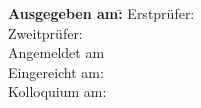 \vspace*{19cm}
\begin{tabbing}
    \textbf{Ausgegeben am:}\qquad \= \kill
    \textsf{Erstprüfer:} \> 	\textsf{\workReferent}\\[0.2cm]
    \textsf{Zweitprüfer:} \> \textsf{\workKorreferent}\\[0.2cm]
    \textsf{Angemeldet am} \> \textsf{\workAusgabe}\\[0.2cm]
    \textsf{Eingereicht am:} \> \textsf{\workAbgabe}\\[0.2cm]
    \textsf{Kolloquium am:} \> \textsf{\workKolloqium}\\[0.2cm]
\end{tabbing}